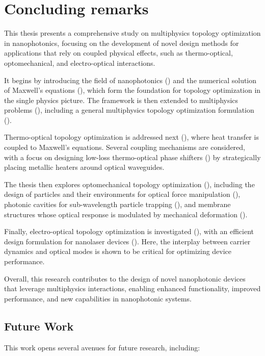\chapter{Concluding remarks}

This thesis presents a comprehensive study on multiphysics topology optimization in nanophotonics, focusing on the development of novel design methods for applications that rely on coupled physical effects, such as thermo-optical, optomechanical, and electro-optical interactions.

It begins by introducing the field of nanophotonics () and the numerical solution of Maxwell's equations (), which form the foundation for topology optimization in the single physics picture. The framework is then extended to multiphysics problems (), including a general multiphysics topology optimization formulation ().

Thermo-optical topology optimization is addressed next (), where heat transfer is coupled to Maxwell's equations. Several coupling mechanisms are considered, with a focus on designing low-loss thermo-optical phase shifters () by strategically placing metallic heaters around optical waveguides.

The thesis then explores optomechanical topology optimization (), including the design of particles and their environments for optical force manipulation (), photonic cavities for sub-wavelength particle trapping (), and membrane structures whose optical response is modulated by mechanical deformation ().

Finally, electro-optical topology optimization is investigated (), with an efficient design formulation for nanolaser devices (). Here, the interplay between carrier dynamics and optical modes is shown to be critical for optimizing device performance. 

Overall, this research contributes to the design of novel nanophotonic devices that leverage multiphysics interactions, enabling enhanced functionality, improved performance, and new capabilities in nanophotonic systems.
\section{Future Work}

This work opens several avenues for future research, including:

